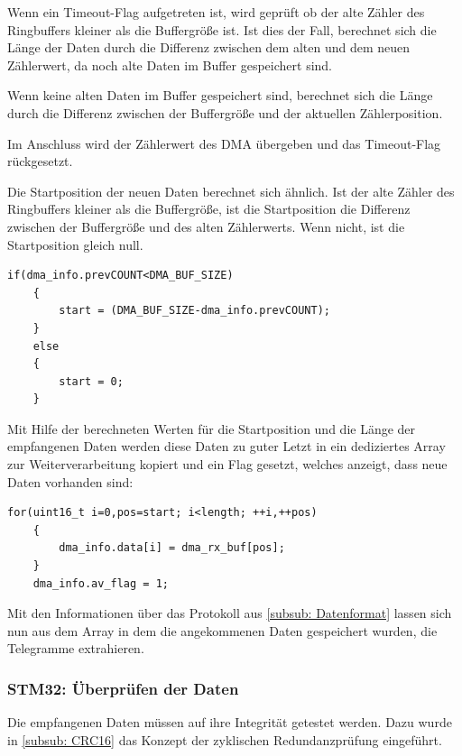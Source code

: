   Wenn ein Timeout-Flag aufgetreten ist, wird geprüft ob der alte Zähler des Ringbuffers kleiner als die Buffergröße ist. Ist dies der Fall, berechnet
  sich die Länge der Daten durch die Differenz zwischen dem alten und dem neuen Zählerwert, da noch alte Daten im Buffer gespeichert sind.
  
  Wenn keine alten Daten im Buffer gespeichert sind, berechnet sich die Länge durch die Differenz zwischen der Buffergröße und der aktuellen Zählerposition.

  \smallskip

  Im Anschluss wird der Zählerwert des \ac{DMA} übergeben und das Timeout-Flag rückgesetzt.

  \smallskip

  Die Startposition der neuen Daten berechnet sich ähnlich. Ist der alte Zähler des Ringbuffers kleiner als die Buffergröße, ist die Startposition
  die Differenz zwischen der Buffergröße und des alten Zählerwerts. Wenn nicht, ist die Startposition gleich null.

  \begin{lstlisting}[caption={\textit{Berechnung Startposition}}]
    if(dma_info.prevCOUNT<DMA_BUF_SIZE)
    {
    	start = (DMA_BUF_SIZE-dma_info.prevCOUNT);
    }
    else
    {
    	start = 0;
    }  
  \end{lstlisting}

  \smallskip

  Mit Hilfe der berechneten Werten für die Startposition und die Länge der empfangenen Daten werden diese Daten zu guter Letzt in ein dediziertes
  Array zur Weiterverarbeitung kopiert und ein Flag gesetzt, welches anzeigt, dass neue Daten vorhanden sind:
  
  \begin{lstlisting}[caption={\textit{Kopieren neuer Daten}}]
    for(uint16_t i=0,pos=start; i<length; ++i,++pos)
    {
        dma_info.data[i] = dma_rx_buf[pos];
    }
    dma_info.av_flag = 1;
  \end{lstlisting}

  Mit den Informationen über das Protokoll aus \ref{subsub: Datenformat} lassen sich nun aus dem Array in dem die angekommenen Daten gespeichert wurden, die Telegramme extrahieren.

\subsubsection{STM32: Überprüfen der Daten}

Die empfangenen Daten müssen auf ihre Integrität getestet werden. Dazu wurde in \ref{subsub: CRC16} das Konzept der zyklischen Redundanzprüfung eingeführt.

